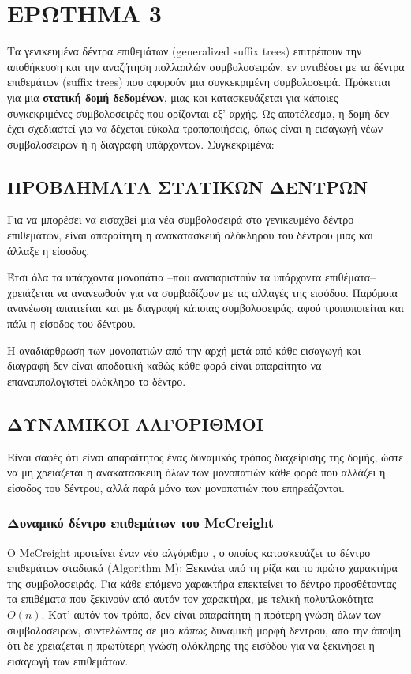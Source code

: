 \chapter{ΕΡΩΤΗΜΑ 3}

    Τα γενικευμένα δέντρα επιθεμάτων (generalized suffix trees) επιτρέπουν την αποθήκευση και την αναζήτηση πολλαπλών συμβολοσειρών, εν αντιθέσει με τα δέντρα επιθεμάτων (suffix trees) που αφορούν μια συγκεκριμένη συμβολοσειρά.
    Πρόκειται για μια \textbf{στατική δομή δεδομένων}, μιας και κατασκευάζεται για κάποιες συγκεκριμένες συμβολοσειρές που ορίζονται εξ' αρχής.
    Ως αποτέλεσμα, η δομή δεν έχει σχεδιαστεί για να δέχεται εύκολα τροποποιήσεις, όπως είναι η εισαγωγή νέων συμβολοσειρών ή η διαγραφή υπάρχοντων. Συγκεκριμένα:

    \section{ΠΡΟΒΛΗΜΑΤΑ ΣΤΑΤΙΚΩΝ ΔΕΝΤΡΩΝ}
        Για να μπορέσει να εισαχθεί μια νέα συμβολοσειρά στο γενικευμένο δέντρο επιθεμάτων, είναι απαραίτητη η ανακατασκευή ολόκληρου του δέντρου μιας και άλλαξε η είσοδος.

        Έτσι όλα τα υπάρχοντα μονοπάτια --που αναπαριστούν τα υπάρχοντα επιθέματα-- χρειάζεται να ανανεωθούν για να συμβαδίζουν με τις αλλαγές της εισόδου.
        Παρόμοια ανανέωση απαιτείται και με διαγραφή κάποιας συμβολοσειράς, αφού τροποποιείται και πάλι η είσοδος του δέντρου.

        Η αναδιάρθρωση των μονοπατιών από την αρχή μετά από κάθε εισαγωγή και διαγραφή δεν είναι αποδοτική καθώς κάθε φορά είναι απαραίτητο να επαναυπολογιστεί ολόκληρο το δέντρο.

    \section{ΔΥΝΑΜΙΚΟΙ ΑΛΓΟΡΙΘΜΟΙ}
        Είναι σαφές ότι είναι απαραίτητος ένας δυναμικός τρόπος διαχείρισης της δομής, ώστε να μη χρειάζεται η ανακατασκευή όλων των μονοπατιών κάθε φορά που αλλάζει η είσοδος του δέντρου, αλλά παρά μόνο των μονοπατιών που επηρεάζονται.

        \subsection{Δυναμικό δέντρο επιθεμάτων του McCreight}
            Ο McCreight προτείνει έναν νέο αλγόριθμο \cite{McCreight_1976}, ο οποίος κατασκευάζει το δέντρο επιθεμάτων σταδιακά (Algorithm M):
            Ξεκινάει από τη ρίζα και το πρώτο χαρακτήρα της συμβολοσειράς.
            Για κάθε επόμενο χαρακτήρα επεκτείνει το δέντρο προσθέτοντας τα επιθέματα που ξεκινούν από αυτόν τον χαρακτήρα, με τελική πολυπλοκότητα \(O(n)\).
            Κατ' αυτόν τον τρόπο, δεν είναι απαραίτητη η πρότερη γνώση όλων των συμβολοσειρών, συντελώντας σε μια \textit{κάπως} δυναμική μορφή δέντρου, από την άποψη ότι δε χρειάζεται η πρωτύτερη γνώση ολόκληρης της εισόδου για να ξεκινήσει η εισαγωγή των επιθεμάτων.

